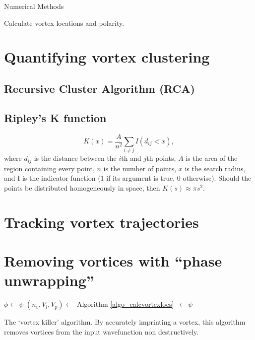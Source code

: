\begin{chapter}{\label{cha:numerics}Numerical Methods}
\begin{algorithm}
	\caption{Calculate vortex locations and polarity.}\label{algo_calcvortexlocs}
	\end{algorithm}
\DecMargin{1em}



\section{\label{section:vortexclustering} Quantifying vortex clustering}
	\subsection{\label{section:reevesalgorithm} Recursive Cluster Algorithm (RCA) }
	\subsection{\label{section:ripleysk} Ripley's K function }
		\begin{equation}\label{eq:ripleysk}
		K(x) = \frac{A}{n^2}\sum\limits_{i \ne j} I\left (d_{ij}<x\right ),
		\end{equation}
		where $d_{ij}$ is the distance between the $i$th and $j$th points, $A$ is the area of the region containing every point, $n$ is the number of points, $x$ is the search radius, and I is the indicator function (1 if its argument is true, 0 otherwise). Should the points be distributed homogeneously in space, then $K(s)\approx\pi s^2$.
\section{\label{section:vortextracking} Tracking vortex trajectories}
\section{\label{section:vortexremoval} Removing vortices with ``phase unwrapping''}
\IncMargin{1em}
	\begin{algorithm}
	\BlankLine
	$\phi \leftarrow \psi$\;
	$(n_v,V_l,V_p)\leftarrow$ Algorithm \ref{algo_calcvortexlocs}~$\leftarrow\psi$\;


	\caption{The `vortex killer' algorithm. By accurately imprinting a vortex, this algorithm removes vortices from the input wavefunction non destructively.}\label{algo_vortexkiller}
	\end{algorithm}
\DecMargin{1em}

\end{chapter}
